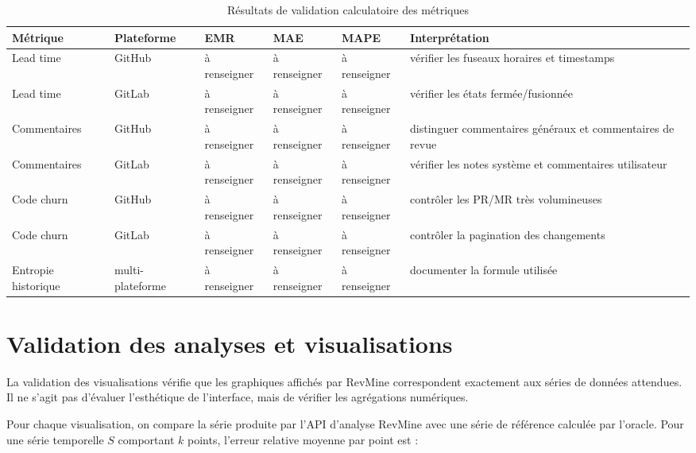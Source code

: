 \begin{table}[H]
\centering
\small
\caption{Résultats de validation calculatoire des métriques}
\label{tab:resultats-validation-calculatoire}
\begin{tabularx}{\textwidth}{|p{2.6cm}|p{1.5cm}|p{1.5cm}|p{1.5cm}|p{1.6cm}|X|}
\hline
\textbf{Métrique} & \textbf{Plateforme} & \textbf{EMR} & \textbf{MAE} & \textbf{MAPE} & \textbf{Interprétation} \\
\hline
Lead time & GitHub & à renseigner & à renseigner & à renseigner & vérifier les fuseaux horaires et timestamps \\
\hline
Lead time & GitLab & à renseigner & à renseigner & à renseigner & vérifier les états fermée/fusionnée \\
\hline
Commentaires & GitHub & à renseigner & à renseigner & à renseigner & distinguer commentaires généraux et commentaires de revue \\
\hline
Commentaires & GitLab & à renseigner & à renseigner & à renseigner & vérifier les notes système et commentaires utilisateur \\
\hline
Code churn & GitHub & à renseigner & à renseigner & à renseigner & contrôler les PR/MR très volumineuses \\
\hline
Code churn & GitLab & à renseigner & à renseigner & à renseigner & contrôler la pagination des changements \\
\hline
Entropie historique & multi-plateforme & à renseigner & à renseigner & à renseigner & documenter la formule utilisée \\
\hline
\end{tabularx}
\end{table}

\section{Validation des analyses et visualisations}
\label{sec:validation-visualisations}

La validation des visualisations vérifie que les graphiques affichés par RevMine correspondent exactement aux séries de données attendues. Il ne s'agit pas d'évaluer l'esthétique de l'interface, mais de vérifier les agrégations numériques.

Pour chaque visualisation, on compare la série produite par l'API d'analyse RevMine avec une série de référence calculée par l'oracle. Pour une série temporelle $S$ comportant $k$ points, l'erreur relative moyenne par point est :

